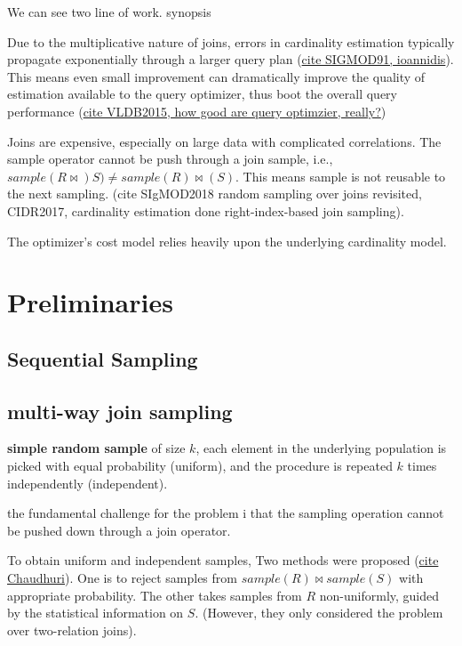 \documentclass[runningheads]{llncs}
\begin{document}
We can see two line of work. synopsis

Due to the multiplicative nature of joins, errors in cardinality estimation typically propagate exponentially through a larger query plan (\underline{cite SIGMOD91, ioannidis}). This means even small improvement can dramatically improve the quality of estimation available to the query optimizer, thus boot the overall query performance (\underline{cite VLDB2015, how good are query optimzier, really?}) 


Joins are expensive, especially on large data with complicated correlations. The sample operator cannot be push through a join sample, i.e., $sample(R \bowtie) S) \neq sample(R) \bowtie(S)$. This means sample is not reusable to the next sampling. (cite SIgMOD2018 random sampling over joins revisited, CIDR2017, cardinality estimation done right-index-based join sampling).

The optimizer's cost model relies heavily upon the  underlying cardinality model.


%
%

\section{Preliminaries}

\subsection{Sequential Sampling}

\subsection{multi-way join sampling}

\textbf{simple random sample} of size $k$, each element in the underlying population is  picked with equal probability (uniform), and the procedure is repeated $k$ times independently (independent).

the fundamental challenge for the problem i that the sampling operation cannot be pushed down through a join operator. 

To obtain uniform and independent samples, Two methods were proposed (\underline{cite Chaudhuri}). One is to reject samples from $sample(R) \bowtie sample(S)$ with appropriate probability. The other takes samples from $R$ non-uniformly, guided by the statistical information on $S$. (However, they only considered the problem over two-relation joins).
\end{document}
